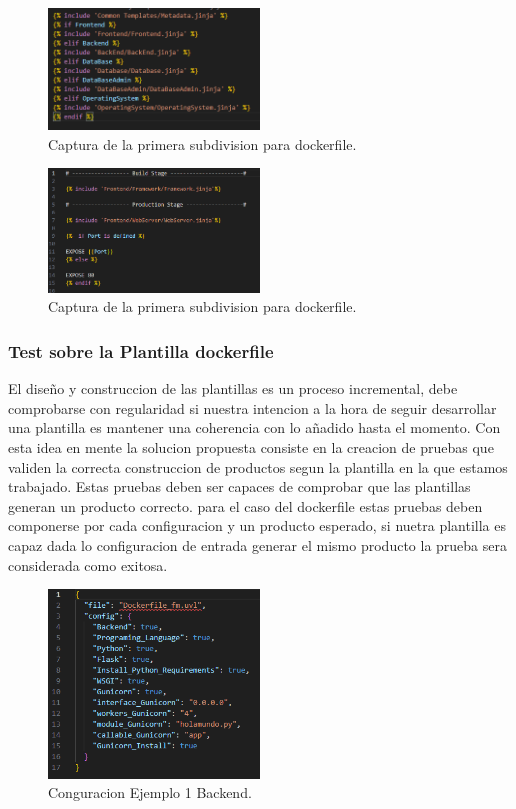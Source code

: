 \documentclass[12pt, a4paper, twoside]{article}
\begin{document}
\begin{figure}[ht]
	\centering
	  \includegraphics[width=0.5\textwidth]{dockerfile.logica.plantillas.jinja.png}
	\caption{Captura de la primera subdivision para dockerfile.}
\end{figure}

\begin{figure}[ht]
	\centering
	  \includegraphics[width=0.5\textwidth]{dockerfile.frontend.jinja.template.png}
	\caption{Captura de la primera subdivision para dockerfile.}
\end{figure}

\subsubsection{Test sobre la Plantilla dockerfile}
El diseño y construccion de las plantillas es un proceso incremental, debe comprobarse con regularidad si nuestra intencion a la hora de seguir desarrollar una plantilla es mantener 
una coherencia con lo añadido hasta el momento. Con esta idea en mente la solucion propuesta consiste en la creacion de pruebas que validen la correcta construccion de productos segun la plantilla en la que estamos trabajado.
Estas pruebas deben ser capaces de comprobar que las plantillas generan un producto correcto. para el caso del dockerfile estas pruebas deben componerse por cada configuracion 
y un producto esperado, si nuetra plantilla es capaz dada lo configuracion de entrada generar el mismo producto la prueba sera considerada como exitosa. 

\newpage

\begin{figure}[ht]
	\centering
	  \includegraphics[width=0.5\textwidth]{dockerfile.configuracion-backend.png}
	\caption{Conguracion Ejemplo 1 Backend.}
\end{figure}
\end{document}
